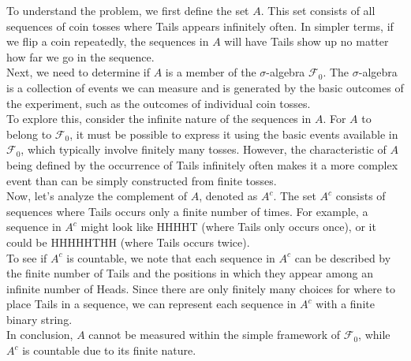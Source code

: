 \begin{solution}
    To understand the problem, we first define the set \( A \). This set consists of all sequences of coin tosses where Tails appears infinitely often. In simpler terms, if we flip a coin repeatedly, the sequences in \( A \) will have Tails show up no matter how far we go in the sequence.\\

    Next, we need to determine if \( A \) is a member of the \(\sigma\)-algebra \( \mathcal{F}_0 \). The \(\sigma\)-algebra is a collection of events we can measure and is generated by the basic outcomes of the experiment, such as the outcomes of individual coin tosses.\\
    
    To explore this, consider the infinite nature of the sequences in \( A \). For \( A \) to belong to \( \mathcal{F}_0 \), it must be possible to express it using the basic events available in \( \mathcal{F}_0\), which typically involve finitely many tosses. However, the characteristic of \( A \) being defined by the occurrence of Tails infinitely often makes it a more complex event than can be simply constructed from finite tosses.\\
    
    Now, let’s analyze the complement of \( A \), denoted as \( A^c \). The set \( A^c \) consists of sequences where Tails occurs only a finite number of times. For example, a sequence in \( A^c \) might look like HHHHT (where Tails only occurs once), or it could be HHHHHTHH (where Tails occurs twice). \\
    
    To see if \( A^c \) is countable, we note that each sequence in \( A^c \) can be described by the finite number of Tails and the positions in which they appear among an infinite number of Heads. Since there are only finitely many choices for where to place Tails in a sequence, we can represent each sequence in \( A^c \) with a finite binary string.\\
    
    In conclusion, \( A \) cannot be measured within the simple framework of \(\mathcal{F}_0\), while \( A^c \) is countable due to its finite nature.
\end{solution}

